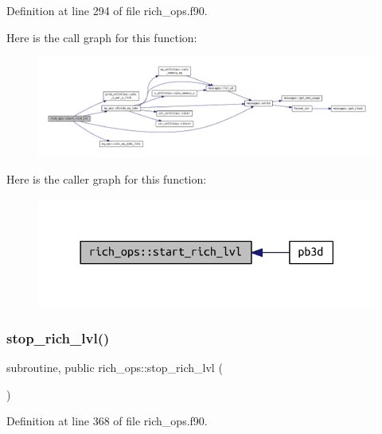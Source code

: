 Definition at line 294 of file rich\+\_\+ops.\+f90.

Here is the call graph for this function\+:
\nopagebreak
\begin{figure}[H]
\begin{center}
\leavevmode
\includegraphics[width=350pt]{namespacerich__ops_a97206a15127960366fcb41d6889cb3b5_cgraph}
\end{center}
\end{figure}
Here is the caller graph for this function\+:
\nopagebreak
\begin{figure}[H]
\begin{center}
\leavevmode
\includegraphics[width=318pt]{namespacerich__ops_a97206a15127960366fcb41d6889cb3b5_icgraph}
\end{center}
\end{figure}
\mbox{\label{namespacerich__ops_a56eae87ecc82010895d63b45a16e6106}} 
\subsubsection{\texorpdfstring{stop\+\_\+rich\+\_\+lvl()}{stop\_rich\_lvl()}}
{\footnotesize\ttfamily subroutine, public rich\+\_\+ops\+::stop\+\_\+rich\+\_\+lvl (\begin{DoxyParamCaption}{ }\end{DoxyParamCaption})}



Definition at line 368 of file rich\+\_\+ops.\+f90.

